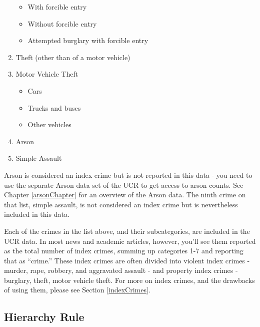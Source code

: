 \documentclass[
  12pt,
  openany]{book}
\providecommand{\tightlist}{%
  \setlength{\itemsep}{0pt}\setlength{\parskip}{0pt}}
\begin{document}
\begin{enumerate}
  \begin{itemize}
  \tightlist
  \item
    With forcible entry\\
  \item
    Without forcible entry\\
  \item
    Attempted burglary with forcible entry\\
  \end{itemize}
\item
  Theft (other than of a motor vehicle)\\
\item
  Motor Vehicle Theft

  \begin{itemize}
  \tightlist
  \item
    Cars\\
  \item
    Trucks and buses\\
  \item
    Other vehicles\\
  \end{itemize}
\item
  Arson\\
\item
  Simple Assault
\end{enumerate}

Arson is considered an index crime but is not reported in this data - you need to use the separate Arson data set of the UCR to get access to arson counts. See Chapter \ref{arsonChapter} for an overview of the Arson data. The ninth crime on that list, simple assault, is not considered an index crime but is nevertheless included in this data.

Each of the crimes in the list above, and their subcategories, are included in the UCR data. In most news and academic articles, however, you'll see them reported as the total number of index crimes, summing up categories 1-7 and reporting that as ``crime.'' These index crimes are often divided into violent index crimes - murder, rape, robbery, and aggravated assault - and property index crimes - burglary, theft, motor vehicle theft. For more on index crimes, and the drawbacks of using them, please see Section \ref{indexCrimes}.

\hypertarget{hierarchy}{%
\subsection{Hierarchy Rule}\label{hierarchy}}
\end{document}
